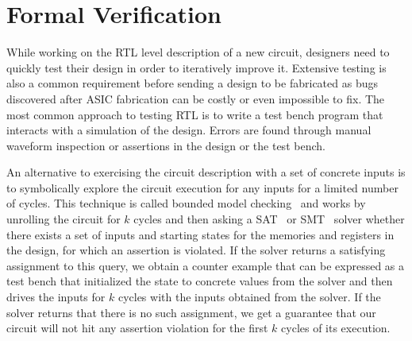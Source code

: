 \documentclass[conference]{IEEEtran}
\begin{document}
\section{Formal Verification}

While working on the RTL level description of a new circuit, designers need to quickly test their design
in order to iteratively improve it. Extensive testing is also a common requirement before sending a design to be
fabricated as bugs discovered after ASIC fabrication can be costly or even impossible to fix.
The most common approach to testing RTL is to write a test bench program that interacts with a simulation of the design.
Errors are found through manual waveform inspection or assertions in the design or the test bench.

An alternative to exercising the circuit description with a set of concrete inputs is to symbolically explore the circuit execution
for any inputs for a limited number of cycles.
This technique is called bounded model checking~\cite{bmc} and works by unrolling the circuit for $k$ cycles and then asking a
SAT~\cite{sat} or SMT~\cite{smt} solver whether there exists a set of inputs and starting states for the memories and registers in the
design, for which an assertion is violated.
If the solver returns a satisfying assignment to this query, we obtain a counter example that can be expressed as a test bench that
initialized the state to concrete values from the solver and then drives the inputs for $k$ cycles with the inputs obtained from the solver.
If the solver returns that there is no such assignment, we get a guarantee that our circuit will not hit any assertion violation for the first $k$
cycles of its execution.
\end{document}
